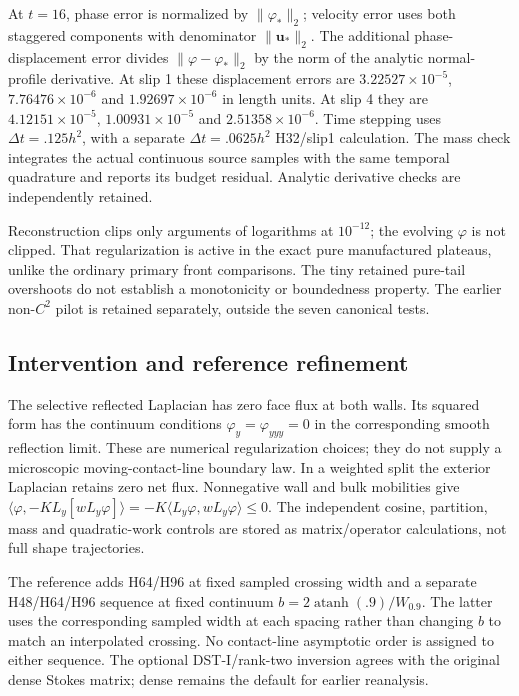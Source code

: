At $t=16$, phase error is normalized by $\|\varphi_*\|_2$; velocity error
uses both staggered components with denominator $\|\bm u_*\|_2$.
The additional phase-displacement error divides
$\|\varphi-\varphi_*\|_2$ by the norm of the analytic normal-profile
derivative. At slip 1 these displacement errors are
$3.22527\times10^{-5}$, $7.76476\times10^{-6}$ and
$1.92697\times10^{-6}$ in length units.
At slip 4 they are $4.12151\times10^{-5}$,
$1.00931\times10^{-5}$ and $2.51358\times10^{-6}$.
Time stepping uses $\Delta t=.125h^2$, with a separate
$\Delta t=.0625h^2$ H32/slip1 calculation.
The mass check integrates the actual continuous source samples with the
same temporal quadrature and reports its budget residual.
Analytic derivative checks are independently retained.

Reconstruction clips only arguments of logarithms at $10^{-12}$;
the evolving $\varphi$ is not clipped.
That regularization is active in the exact pure manufactured plateaus,
unlike the ordinary primary front comparisons.
The tiny retained pure-tail overshoots do not establish a monotonicity or
boundedness property. The earlier non-$C^2$ pilot is retained separately,
outside the seven canonical tests.

\subsection{Intervention and reference refinement}
The selective reflected Laplacian has zero face flux at both walls.
Its squared form has the continuum conditions
$\varphi_y=\varphi_{yyy}=0$ in the corresponding smooth reflection limit.
These are numerical regularization choices; they do not supply a microscopic
moving-contact-line boundary law. In a weighted split the exterior Laplacian
retains zero net flux. Nonnegative wall and bulk mobilities give
$\langle\varphi,-K L_y[wL_y\varphi]\rangle
=-K\langle L_y\varphi,wL_y\varphi\rangle\le0$.
The independent cosine, partition, mass and quadratic-work controls are
stored as matrix/operator calculations, not full shape trajectories.

The reference adds H64/H96 at fixed sampled crossing width and a separate
H48/H64/H96 sequence at fixed continuum
$b=2\operatorname{atanh}(.9)/W_{0.9}$.
The latter uses the corresponding sampled width at each spacing rather
than changing $b$ to match an interpolated crossing.
No contact-line asymptotic order is assigned to either sequence.
The optional DST-I/rank-two inversion agrees with the original dense
Stokes matrix; dense remains the default for earlier reanalysis.

